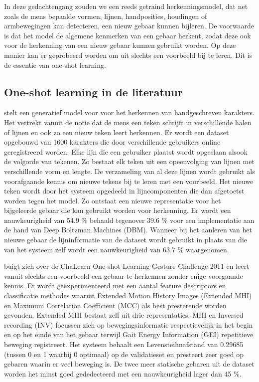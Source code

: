 \npar In deze gedachtengang zouden we een reeds getraind herkenningsmodel, dat net zoals de mens bepaalde vormen, lijnen, handposities, houdingen of armbewegingen kan detecteren, een nieuw gebaar kunnen bijleren. De voorwaarde is dat het model de algemene kenmerken van een gebaar herkent, zodat deze ook voor de herkenning van een nieuw gebaar kunnen gebruikt worden. Op deze manier kan er geprobeerd worden om uit slechts een voorbeeld bij te leren. Dit is de essentie van one-shot learning. 

\subsection{One-shot learning in de literatuur}
\npar \cite{oneshot-vis-concepts} stelt een generatief model voor voor het herkennen van handgeschreven karakters. Het vertrekt vanuit de notie dat de mens een teken schrijft in verschillende halen of lijnen en ook zo een nieuw teken leert herkennen. Er wordt een dataset opgebouwd van 1600 karakters die door verschillende gebruikers online geregistreerd worden. Elke lijn die een gebruiker plaatst wordt opgeslaan alsook de volgorde van tekenen. Zo bestaat elk teken uit een opeenvolging van lijnen met verschillende vorm en lengte. De verzameling van al deze lijnen wordt gebruikt als voorafgaande kennis om nieuwe tekens bij te leren met een voorbeeld. Het nieuwe teken wordt door het systeem opgedeeld in lijncomponenten die dan afgetoetst worden tegen het model. Zo ontstaat een nieuwe representatie voor het bijgeleerde gebaar die kan gebruikt worden voor herkenning. Er wordt een nauwkeurigheid van 54.9 \% behaald tegenover 39.6 \% voor een implementatie aan de hand van Deep Boltzman Machines (DBM). Wanneer bij het aanleren van het nieuwe gebaar de lijninformatie van de dataset wordt gebruikt in plaats van die van het systeem zelf wordt een nauwkeurigheid van 63.7 \% waargenomen.

\npar \cite{oneshot-gesture-rgbd} buigt zich over de ChaLearn One-shot Learning Gesture Challenge 2011 en leert vanuit slechts een voorbeeld een gebaar te herkennen zonder enige voorgaande kennis. Er wordt ge\"experimenteerd met een aantal feature descriptors en classificatie methodes waaruit Extended Motion History Images (Extended MHI) en Maximum Correlation Co\"effici\"ent (MCC) als best presterende worden gevonden. Extended MHI  bestaat zelf uit drie representaties: MHI en Inversed recording (INV) focussen zich op bewegingsinformatie respectievelijk in het begin en op het einde van het gebaar terwijl Gait Energy Information (GEI) repetitieve beweging registreert. Het systeem behaalt een Levensteihnafstand van 0.29685 (tussen 0 en 1 waarbij 0 optimaal) op de validatieset en presteert zeer goed op gebaren waarin er veel beweging is. De twee meer statische gebaren uit de dataset worden het minst goed gededecteerd met een nauwkeurigheid lager dan 45 \%.

